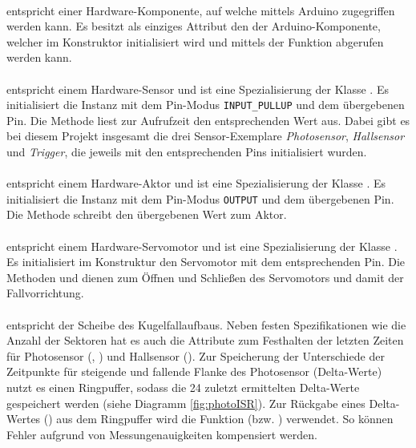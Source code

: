 \paragraph{} entspricht einer Hardware-Komponente, auf welche mittels Arduino zugegriffen werden kann.
Es besitzt als einziges Attribut den  der Arduino-Komponente, welcher im Konstruktor initialisiert wird und mittels der Funktion  abgerufen werden kann.

\paragraph{} entspricht einem Hardware-Sensor und ist eine Spezialisierung der Klasse . 
Es initialisiert die Instanz mit dem Pin-Modus \texttt{INPUT\_PULLUP} und dem übergebenen Pin.
Die Methode  liest zur Aufrufzeit den entsprechenden Wert aus.
Dabei gibt es bei diesem Projekt insgesamt die drei Sensor-Exemplare \textit{Photosensor}, \textit{Hallsensor} und \textit{Trigger}, die jeweils mit den entsprechenden Pins initialisiert wurden. 

\paragraph{} entspricht einem Hardware-Aktor und ist eine Spezialisierung der Klasse .
Es initialisiert die Instanz mit dem Pin-Modus \texttt{OUTPUT} und dem übergebenen Pin.
Die Methode  schreibt den übergebenen Wert zum Aktor.

\paragraph{} entspricht einem Hardware-Servomotor und ist eine Spezialisierung der Klasse .
Es initialisiert im Konstruktur den Servomotor mit dem entsprechenden Pin.
Die Methoden  und  dienen zum Öffnen und Schließen des Servomotors und damit der Fallvorrichtung.

\paragraph{} entspricht der Scheibe des Kugelfallaufbaus.
Neben festen Spezifikationen wie die Anzahl der Sektoren hat es auch die Attribute zum Festhalten der letzten Zeiten für Photosensor  (, ) und Hallsensor (). 
Zur Speicherung der Unterschiede der Zeitpunkte für steigende und fallende Flanke des Photosensor (Delta-Werte) nutzt es einen Ringpuffer, sodass die 24 zuletzt ermittelten Delta-Werte gespeichert werden (siehe Diagramm \ref{fig:photoISR}).
Zur Rückgabe eines Delta-Wertes () aus dem Ringpuffer wird die Funktion  (bzw. ) verwendet.
So können Fehler aufgrund von Messungenauigkeiten kompensiert werden.

